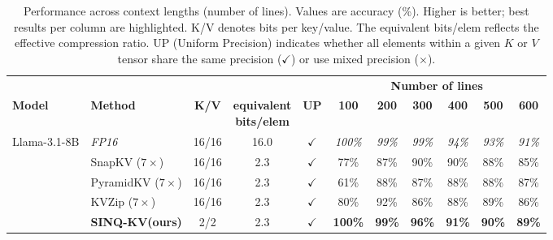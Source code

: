 \documentclass{llmxive}
\providecommand{\ours}[1]{\cellcolor{customblue!30}#1}
\providecommand{\others}[1]{\cellcolor{gray!10}#1}
\providecommand{\methodname}{SINQ-KV\xspace}
\begin{document}
\begin{table}[t]
\centering
\begin{threeparttable}
\small
\setlength{\tabcolsep}{3pt}
\begin{tabular}{l l c c c c c c c c c}
\toprule
& & & & & \multicolumn{6}{c}{\textbf{Number of lines}} \\
\cmidrule(lr){6-11}
\textbf{Model} & \textbf{Method} 
& \textbf{K/V}
& \makecell{\textbf{equivalent}\\\textbf{bits/elem}}
& \textbf{UP}
& \textbf{100} & \textbf{200} & \textbf{300} & \textbf{400} & \textbf{500} & \textbf{600} \\
\midrule

\multirow{6}{*}{Llama-3.1-8B}
 & \textit{FP16} & 16/16 & 16.0 & $\checkmark$
   & \textit{100\%} & \textit{99\%} & \textit{99\%} & \textit{94\%} & \textit{93\%} & \textit{91\%} \\
\cmidrule(lr){2-11}
 & \others{SnapKV ($7\times$)} & \others{16/16} & \others{2.3} & \others{$\checkmark$}
   & \others{77\%} & \others{87\%} & \others{90\%} & \others{90\%} & \others{88\%} & \others{85\%} \\
 & \others{PyramidKV ($7\times$)} & \others{16/16} & \others{2.3} & \others{$\checkmark$}
   & \others{61\%} & \others{88\%} & \others{87\%} & \others{88\%} & \others{88\%} & \others{87\%} \\
 & \others{KVZip ($7\times$)} & \others{16/16} & \others{2.3} & \others{$\checkmark$}
   & \others{80\%} & \others{92\%} & \others{86\%} & \others{88\%} & \others{89\%} & \others{86\%} \\
 & \textbf{\ours{\methodname (ours)}} 
   & \ours{2/2} & \ours{2.3} & \ours{$\checkmark$}
   & \ours{\textbf{100\%}} & \ours{\textbf{99\%}} & \ours{\textbf{96\%}} & \ours{\textbf{91\%}} & \ours{\textbf{90\%}} & \ours{\textbf{89\%}} \\

\bottomrule
\end{tabular}
\end{threeparttable}
\caption{Performance across context lengths (number of lines). Values are accuracy (\%). Higher is better; best results per column are highlighted. K/V denotes bits per key/value. The equivalent bits/elem reflects the effective compression ratio. UP (Uniform Precision) indicates whether all elements within a given $K$ or $V$ tensor share the same precision ($\checkmark$) or use mixed precision ($\times$).}
\label{tab:eviction}
\end{table}
\end{document}
